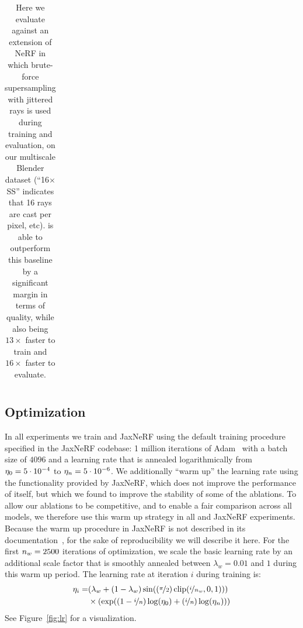\documentclass[10pt,twocolumn,letterpaper]{article}
\begin{document}
\begin{table}[]
{\begin{tabular}{@{}l@{\,\,}|c@{\,\,\,}c@{\,\,\,}c@{\,\,\,}c|c@{\,\,\,}c@{\,\,\,}c@{\,\,\,}c|c@{\,\,\,}c@{\,\,\,}c@{\,\,\,}c|c|c@{\,\,\,}c@{\,\,\,}c@{}}
    \end{tabular}
    }
    \caption{
    Here we evaluate \shortmodelnamelower against an extension of NeRF in which brute-force supersampling with jittered rays is used during training and evaluation, on our multiscale Blender dataset (``16$\times$ SS'' indicates that 16 rays are cast per pixel, etc). \shortmodelname is able to outperform this baseline by a significant margin in terms of quality, while also being $13 \times$ faster to train and $16 \times$ faster to evaluate.}
    \label{tab:supertrain}
\end{table}

\subsection{Optimization}

In all experiments we train \shortmodelnamelower and JaxNeRF using the default training procedure specified in the JaxNeRF codebase: 1 million iterations of Adam~\cite{adam} with a batch size of $4096$ and a learning rate that is annealed logarithmically from $\eta_{0} = 5 \cdot 10^{-4}$ to $\eta_{n} =5 \cdot 10^{-6}$. We additionally ``warm up'' the learning rate using the functionality provided by JaxNeRF, which does not improve the performance of \shortmodelnamelower itself, but which we found to improve the stability of some of the \shortmodelnamelower ablations. To allow our ablations to be competitive, and to enable a fair comparison across all models, we therefore use this warm up strategy in all \shortmodelnamelower and JaxNeRF experiments. Because the warm up procedure in JaxNeRF is not described in its documentation~\cite{jaxnerf2020github}, for the sake of reproducibility we will describe it here. For the first $n_{w} = 2500$ iterations of optimization, we scale the basic learning rate by an additional scale factor that is smoothly annealed between $\lambda_{w} = 0.01$ and $1$ during this warm up period.
The learning rate at iteration $i$ during training is:
\begin{align}
\learnrate_i = & \left( \lambda_{w} + (1 - \lambda_{w}) \sin(
        (\nicefrac{\pi}{2}) \operatorname{clip}(\nicefrac{i}{\numsteps_{w}}, 0, 1)) \right) \nonumber \\
        & \times \left( \exp((1 - \nicefrac{i}{\numsteps})\log(\learnrate_{0}) + (\nicefrac{i}{\numsteps}) \log(\learnrate_{n})) \right)
\end{align}
See Figure~\ref{fig:lr} for a visualization.
\end{document}
